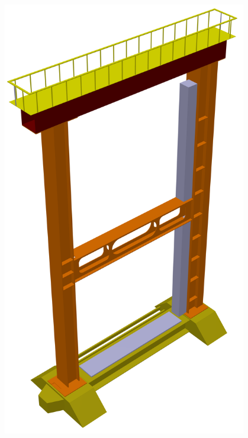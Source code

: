 \begin{figure}[H]
\begin{minipage}[b]{0.31\textwidth}
\caption{}
\label{fig:CbmEcal1}
\end{minipage}
\hspace{0.01\textwidth}
\begin{minipage}[b]{0.31\textwidth}
\includegraphics[width=0.95\textwidth]{pictures/ECAL_SIS300_CATIA_g4.png}
\caption{}
\label{fig:CbmEcal2}
\end{minipage}
\hspace{0.01\textwidth}
\begin{minipage}[b]{0.31\textwidth}

\end{minipage}
\end{figure}
